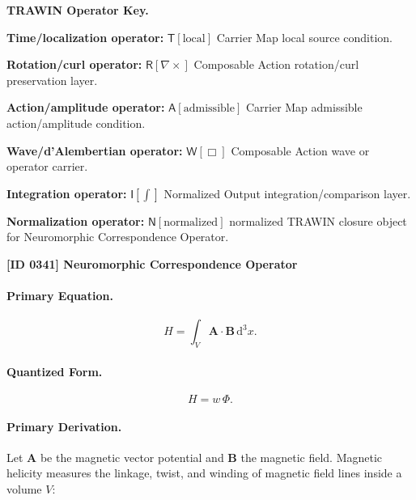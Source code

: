 \par\vspace{0.45\baselineskip}
\noindent\begin{minipage}[t]{\linewidth}
\begingroup
\small
\raggedright
\textbf{TRAWIN Operator Key.}\par
\noindent\textbf{Time/localization operator:} $\mathsf{T}\!\left[\mathrm{local}\right]$ Carrier Map local source condition.\par
\noindent\textbf{Rotation/curl operator:} $\mathsf{R}\!\left[\nabla\times\right]$ Composable Action rotation/curl preservation layer.\par
\noindent\textbf{Action/amplitude operator:} $\mathsf{A}\!\left[\mathrm{admissible}\right]$ Carrier Map admissible action/amplitude condition.\par
\noindent\textbf{Wave/d'Alembertian operator:} $\mathsf{W}\!\left[\Box\right]$ Composable Action wave or operator carrier.\par
\noindent\textbf{Integration operator:} $\mathsf{I}\!\left[\int\right]$ Normalized Output integration/comparison layer.\par
\noindent\textbf{Normalization operator:} $\mathsf{N}\!\left[\mathrm{normalized}\right]$ normalized TRAWIN closure object for Neuromorphic Correspondence Operator.\par
\endgroup
\end{minipage}

\clearpage
\noindent\textbf{[ID 0341] Neuromorphic Correspondence Operator}\par
\vspace{0.35em}
\paragraph{Primary Equation.}
\begin{equation}
H
=
\int_V
\mathbf{A}\cdot\mathbf{B}
\,\mathrm{d}^3x .
\end{equation}

\paragraph{Quantized Form.}
\begin{equation}
H=w\,\Phi .
\end{equation}

\paragraph{Primary Derivation.}
Let $\mathbf{A}$ be the magnetic vector potential and $\mathbf{B}$ the magnetic field.  
Magnetic helicity measures the linkage, twist, and winding of magnetic field lines inside a volume $V$:

